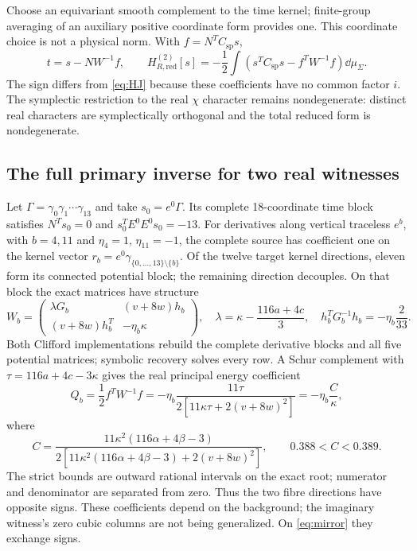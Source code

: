 Choose an equivariant smooth complement to the time kernel; finite-group
averaging of an auxiliary positive coordinate form provides one. This
coordinate choice is not a physical norm. With $f=N^TC_{\mathrm{sp}}s$,
\begin{equation}
 t=s-NW^{-1}f,\qquad
 H_{R,\mathrm{red}}^{(2)}[s]=-\frac12\int
       \left(s^TC_{\mathrm{sp}}s-f^TW^{-1}f\right)\dd\mu_\Sigma.
 \label{eq:HR}
\end{equation}
The sign differs from \eqref{eq:HJ} because these coefficients have no
common factor $i$. The symplectic restriction to the real $\chi$
character remains nondegenerate: distinct real characters are
symplectically orthogonal and the total reduced form is nondegenerate.

\subsection{The full primary inverse for two real witnesses}
Let $\Gamma=\gamma_0\gamma_1\cdots\gamma_{13}$ and take
$s_0=e^0\Gamma$. Its complete 18-coordinate time block satisfies
$N^Ts_0=0$ and $s_0^TE^0E^0s_0=-13$.
For derivatives along vertical traceless $e^b$, with $b=4,11$ and
$\eta_4=1$, $\eta_{11}=-1$, the complete source has coefficient one
on the kernel vector
$r_b=e^0\gamma_{\{0,\ldots,13\}\setminus\{b\}}$.
Of the twelve target kernel directions, eleven form its connected
potential block; the remaining direction decouples.
On that block the exact matrices have structure
\begin{equation}
 W_b=\begin{pmatrix}
 \lambda G_b&(v+8w)h_b\\
 (v+8w)h_b^T&-\eta_b\kappa
 \end{pmatrix},\quad
 \lambda=\kappa-\frac{116a+4c}{3},\quad
 h_b^TG_b^{-1}h_b=-\eta_b\frac2{33}.
 \label{eq:realblock}
\end{equation}
Both Clifford implementations rebuild the complete derivative blocks and
all five potential matrices; symbolic recovery solves every row.
A Schur complement with $\tau=116a+4c-3\kappa$ gives the real principal
energy coefficient
\begin{equation}
 Q_b=\frac12 f^TW^{-1}f
   =-\eta_b\frac{11\tau}{2[11\kappa\tau+2(v+8w)^2]}
   =-\eta_b\frac{C}{\kappa},\label{eq:realQ}
\end{equation}
where
\begin{equation}
 C=\frac{11\kappa^2(116\alpha+4\beta-3)}
 {2[11\kappa^2(116\alpha+4\beta-3)+2(v+8w)^2]},
 \qquad 0.388<C<0.389.\label{eq:realC}
\end{equation}
The strict bounds are outward rational intervals on the exact root;
numerator and denominator are separated from zero. Thus the two fibre
directions have opposite signs. These coefficients depend on the
background; the imaginary witness's zero cubic columns are not being
generalized. On \eqref{eq:mirror} they exchange signs.

